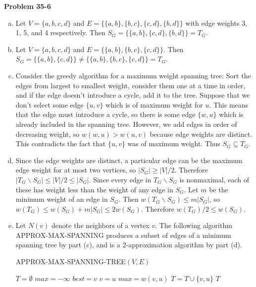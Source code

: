\documentclass{article}
\begin{document}
\noindent\textbf{Problem 35-6}
\begin{enumerate}[a.]
\item Let $V = \{a, b, c, d\}$ and $E = \{\{a,b\}, \{b,c\}, \{c,d\}, \{b,d\} \}$ with edge weights 3, 1, 5, and 4 respectively.  Then $S_G = \{\{a,b\}, \{c,d\}, \{b,d\}\} = T_G$.

\item  Let $V = \{a, b, c, d\}$ and $E = \{\{a,b\}, \{b,c\}, \{c,d\} \}.$  Then $S_G = \{\{a,b\}, \{c,d\}\} \neq \{\{a,b\}, \{b,c\}, \{c,d\}\} = T_G$. 

\item Consider the greedy algorithm for a maximum weight spanning tree:  Sort the edges from largest to smallest weight, consider them one at a time in order, and if the edge doesn't introduce a cycle, add it to the tree.  Suppose that we don't select some edge $\{u,v\}$ which is of maximum weight for $u$.  This means that the edge must introduce a cycle, so there is some edge $\{w,u\}$ which is already included in the spanning tree.  However, we add edges in order of decreasing weight, so $w(w,u) > w(u,v)$ because edge weights are distinct.  This contradicts the fact that $\{u,v\}$ was of maximum weight.   Thus $S_G \subseteq T_G$.

\item Since the edge weights are distinct, a particular edge can be the maximum edge weight for at most two vertices, so $|S_G| \geq |V|/2$. Therefore $|T_G\backslash S_G| \leq |V|/2 \leq |S_G|$.  Since every edge in $T_G \backslash S_G$ is nonmaximal, each of these has weight less than the weight of any edge in $S_G$.  Let $m$ be the minimum weight of an edge in $S_G$.  Then $w(T_G\backslash S_G) \leq m|S_G|$, so $w(T_G) \leq w(S_G) + m|S_G| \leq 2w(S_G).$  Therefore $w(T_G)/2 \leq w(S_G)$.

\item  Let $N(v)$ denote the neighbors of a vertex $v$.  The following algorithm APPROX-MAX-SPANNING produces a subset of edges of a minimum spanning tree by part (c), and is a 2-approximation algorithm by part (d).

\begin{algorithm}
\caption{APPROX-MAX-SPANNING-TREE$(V,E)$}
\begin{algorithmic}[1]
\State $T = \emptyset$
	\State $max = -\infty$
	\State $best = v$
			\State $v = u$
			\State $max = w(v,u)$
		\EndIf
	\EndFor
	\State $T = T \cup \{v,u\}$
\EndFor
\State \Return $T$
\end{algorithmic}
\end{algorithm}

\end{enumerate}
\end{document}
